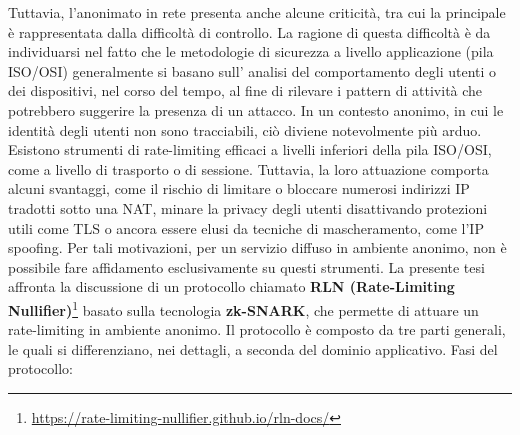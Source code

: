 Tuttavia, l'anonimato in rete presenta anche alcune criticità, tra cui la principale è rappresentata dalla difficoltà di
controllo. La ragione di questa difficoltà è da individuarsi nel fatto che le metodologie di sicurezza a livello applicazione (pila ISO/OSI)
generalmente si basano sull' analisi del comportamento degli utenti o dei dispositivi, nel corso del tempo, al
fine di rilevare i pattern di attività che potrebbero suggerire la presenza di un attacco. In un contesto anonimo, in
cui le identità degli utenti non sono tracciabili, ciò diviene notevolmente più arduo. Esistono strumenti di
rate-limiting efficaci a livelli inferiori della pila ISO/OSI, come a livello di trasporto o di sessione. Tuttavia, la
loro attuazione comporta alcuni svantaggi, come il rischio di limitare o bloccare numerosi indirizzi IP tradotti sotto
una NAT, minare la privacy degli utenti disattivando protezioni utili come TLS o ancora essere elusi da
tecniche di mascheramento, come l'IP spoofing. Per tali motivazioni, per un servizio diffuso in ambiente anonimo, non è
possibile fare affidamento esclusivamente su questi strumenti.
\clearpage
La presente tesi affronta la discussione di un protocollo chiamato \textbf{RLN (Rate-Limiting Nullifier)}\footnote{\url{https://rate-limiting-nullifier.github.io/rln-docs/}} basato sulla tecnologia
\textbf{zk-SNARK}, che permette di attuare un rate-limiting in ambiente anonimo. Il protocollo è composto da tre parti generali,
le quali si differenziano, nei dettagli, a seconda del dominio applicativo.
Fasi del protocollo:
